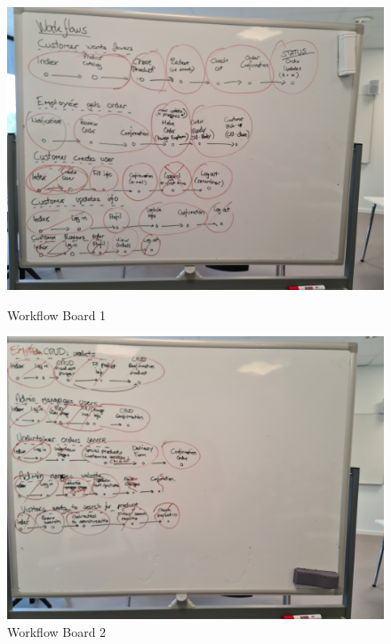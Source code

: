 \begin{figure}[H]
    \centering
    \begin{minipage}[b]{0.45\textwidth}
        \centering
        \includegraphics[width=\textwidth]{figures/scrum/workflow-board-red-rings1.jpg}
        \caption{Workflow Board 1}
        \label{fig:workflow-board-red-ring1}
    \end{minipage}
    \hfill
    \begin{minipage}[b]{0.45\textwidth}
        \centering
        \includegraphics[width=\textwidth]{figures/scrum/workflow-board-red-rings2.jpg}
        \caption{Workflow Board 2}
        \label{fig:workflow-board-red-ring2}
    \end{minipage}
\end{figure}

